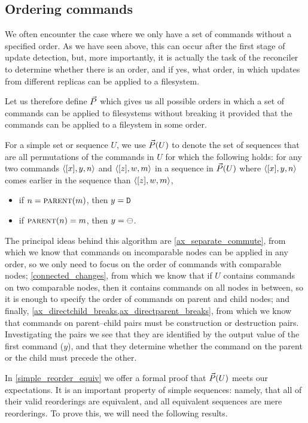 
\subsection{Ordering commands}\label{ordering}

We often encounter the case where we only have a set of commands without a specified order.
As we have seen above, this can occur after the first stage of update detection,
but, more importantly,
it is actually the task of the reconciler to determine whether there is an order,
and if yes, what order,
in which updates from different replicas can be applied to a filesystem.

Let us therefore define $\ordersetsign$ which gives us all
possible orders in which a set of commands can be applied
to filesystems without breaking it
provided that the commands can be applied to a fileystem in some order.

\begin{mydef}[$\ordersetsign$]\label{def_orderset}
For a simple set or sequence $U$,
we use $\vec{P}({U})$ to denote the set of sequences
that are all permutations of the commands in $U$
for which the following holds:
for any two commands $\langle{[x],y,n}\rangle$ and $\langle{[z],w,m}\rangle$ in a sequence in $\vec{P}({U})$
where $\langle{[x],y,n}\rangle$ comes earlier in the sequence than $\langle{[z],w,m}\rangle$,
\begin{itemize}
\item if $n=\text{\normalfont\scshape{parent}}(m)$, then $y=\mathtt{D}$
\item if $\text{\normalfont\scshape{parent}}(n)=m$, then $y=\ominus$.
\end{itemize}
\end{mydef}

The principal ideas behind this algorithm are 
\cref{ax_separate_commute}, from which we know that commands on incomparable
nodes can be applied in any order, so we only need to focus on the order of commands
with comparable nodes;
\cref{connected_changes}, from which we know that if $U$ contains commands on two comparable
nodes, then it contains commands on all nodes in between, so it is enough to specify
the order of commands on parent and child nodes;
and finally, \cref{ax_directchild_breaks,ax_directparent_breaks}, from which we know
that commands on parent--child pairs must be construction or destruction pairs.
Investigating the pairs we see that they are identified by the output value of the first command ($y$),
and that they determine whether the command on the parent or the child must precede the other.

In \cref{simple_reorder_equiv} we offer a formal proof that $\vec{P}({U})$ meets our expectations.
It is an important property of simple sequences: namely, that
all of their valid reorderings are equivalent,
and all equivalent sequences are mere reorderings.
To prove this, we will need the following results.


